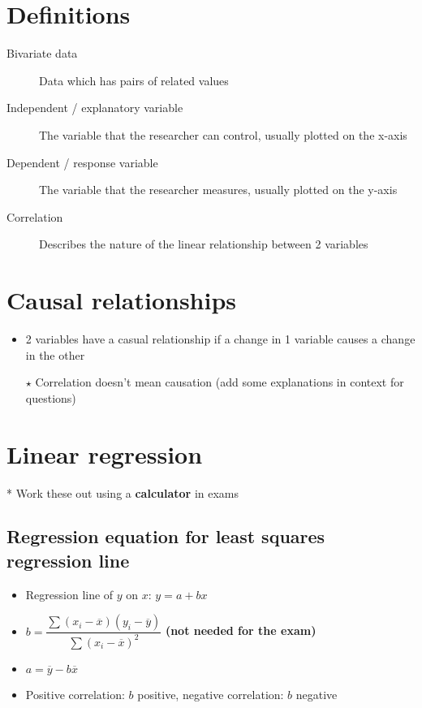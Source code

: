 \section{Definitions}
\begin{description}
    \item[Bivariate data] Data which has pairs of related values
    \item[Independent / explanatory variable] The variable that the researcher can control, usually plotted on the x-axis
    \item[Dependent / response variable] The variable that the researcher measures, usually plotted on the y-axis
    \item[Correlation] Describes the nature of the linear relationship between 2 variables
\end{description}

\section{Causal relationships}
\begin{itemize}
    \item 2 variables have a casual relationship if a change in 1 variable causes a change in the other
    \item[$\star$] Correlation doesn't mean causation (add some explanations in context for questions)
\end{itemize}

\section{Linear regression}
* Work these out using a \textbf{calculator} in exams
\subsection{Regression equation for least squares regression line}
\begin{itemize}
    \item Regression line of $y$ on $x$: $y=a+bx$
    \item $b=\dfrac{\sum (x_i-\overline{x}) (y_i-\overline{y})}{\sum (x_i-\overline{x})^2}$ \textbf{(not needed for the exam)}
    \item $a=\overline{y}-b\overline{x}$
    \item Positive correlation: $b$ positive, negative correlation: $b$ negative
\end{itemize}

